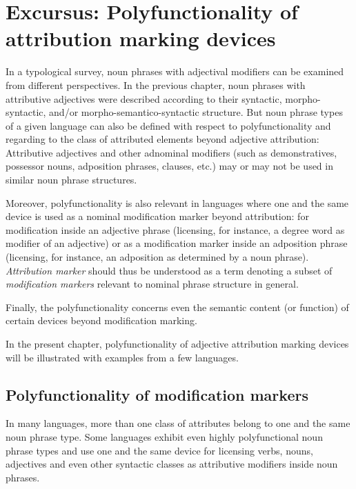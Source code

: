 
\chapter[Polyfunctionality]{Excursus: Polyfunctionality of attribution marking devices} \label{polyfunctionality}
In a typological survey, noun phrases with adjectival modifiers can be examined from different perspectives. In the previous chapter, noun phrases with attributive adjectives were described according to their syntactic, morpho-syntactic, and/or morpho-semantico-syntactic structure. But noun phrase types of a given language can also be defined with respect to polyfunctionality and regarding to the class of attributed elements beyond adjective attribution: Attributive adjectives and other adnominal modifiers (such as demonstratives, possessor nouns, adposition phrases, clauses, etc.) may or may not be used in similar noun phrase structures.

Moreover, polyfunctionality is also relevant in languages where one and the same device is used as a nominal modification marker beyond attribution: for modification inside an adjective phrase (licensing, for instance, a degree word as modifier of an adjective) or as a modification marker inside an adposition phrase (licensing, for instance, an adposition as determined by a noun phrase). \textit{Attribution marker} should thus be understood as a term denoting a subset of \textit{modification markers} relevant to nominal phrase structure in general.

Finally, the polyfunctionality concerns even the semantic content (or function) of certain devices beyond modification marking. 

In the present chapter, polyfunctionality of adjective attribution marking devices will be illustrated with examples from a few languages.

\section{Polyfunctionality of modification markers}
In many languages, more than one class of attributes belong to one and the same noun phrase type. Some languages exhibit even highly polyfunctional noun phrase types and use one and the same device for licensing verbs, nouns, adjectives and even other syntactic classes as attributive modifiers inside noun phrases.

